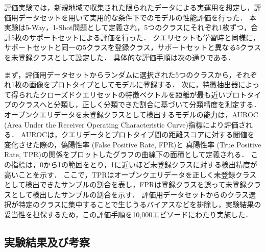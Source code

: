 \documentclass[a4paper,11pt,nomag]{jsreport}
\begin{document}
評価実験では，新規地域で収集された限られたデータによる実運用を想定し，評価用データセットを用いて実用的な条件下でのモデルの性能評価を行った．
本実験は5-Way，1-Shot問題として定義され，5つのクラスにそれぞれ1枚ずつ，合計5枚のサポートセットによる評価を行った．
クエリセットも学習時と同様に，サポートセットと同一の5クラスを登録クラス，サポートセットと異なる5クラスを未登録クラスとして設定した．
具体的な評価手順は次の通りである．

まず，評価用データセットからランダムに選択された5つのクラスから，それぞれ1枚の画像をプロトタイプとしてモデルに登録する．
次に，特徴抽出器によって得られたクローズドクエリセットの特徴ベクトルを距離が最も近いプロトタイプのクラスへと分類し，正しく分類できた割合に基づいて分類精度を測定する．
オープンクエリデータを未登録クラスとして検出するモデルの能力は，AUROC (Area Under the Receiver Operating Characteristic Curve)指標により評価される．
AUROCは，クエリデータとプロトタイプ間の距離スコアに対する閾値を変化させた際の，偽陽性率 (False Positive Rate, FPR)と
真陽性率 (True Positive Rate, TPR)の関係をプロットしたグラフの曲線下の面積として定義される．
この指標は，0から1の範囲をとり，1に近いほど未登録クラスに対する検出精度が高いことを示す．
ここで，TPRはオープンクエリデータを正しく未登録クラスとして検出できたサンプルの割合を表し，FPRは登録クラスを誤って未登録クラスとして検出したサンプルの割合を示す．
評価用データセットからのクラス選択が特定のクラスに集中することで生じうるバイアスなどを排除し，実験結果の妥当性を担保するため，この評価手順を10,000エピソードにわたり実施した．

\subsection{実験結果及び考察}
\end{document}

